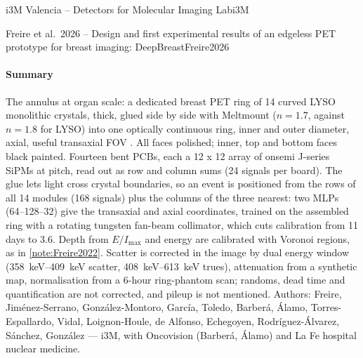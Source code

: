\begin{programnote}{i3M Valencia -- Detectors for Molecular Imaging Lab}{i3M}
\begin{papernote}{Freire et al.\ 2026 -- Design and first experimental results of an edgeless PET prototype for breast imaging: DeepBreast}{Freire2026}
\paragraph{Summary}
The annulus at organ scale: a dedicated breast PET ring of 14 curved LYSO
monolithic crystals,  thick, glued side by side with Meltmount
($n = 1.7$, against $n = 1.8$ for LYSO) into one optically continuous ring,
 inner and  outer diameter,  axial, useful transaxial
FOV . All faces polished; inner, top and bottom faces black painted.
Fourteen bent PCBs, each a 12 x 12 array of onsemi J-series SiPMs at
 pitch, read out as row and column sums (24 signals per board). The
glue lets light cross crystal boundaries, so an event is positioned from the
rows of all 14 modules (168 signals) plus the columns of the three nearest:
two MLPs (64--128--32) give the transaxial and axial coordinates, trained on
the assembled ring with a rotating tungsten fan-beam collimator, which cuts
calibration from 11 days to 3.6. Depth from $E/I_{\max}$ and energy are
calibrated with Voronoi regions, as in \ref{note:Freire2022}. Scatter is
corrected in the image by dual energy window (\qtyrange{358}{409}{\kilo\electronvolt}
scatter, \qtyrange{408}{613}{\kilo\electronvolt} trues), attenuation from a
synthetic map, normalisation from a 6-hour ring-phantom scan; randoms, dead
time and quantification are not corrected, and pileup is not mentioned.
Authors: Freire, Jiménez-Serrano, González-Montoro,
García, Toledo, Barberá, Álamo, Torres-Espallardo, Vidal, Loignon-Houle,
de Alfonso, Echegoyen, Rodríguez-Álvarez, Sánchez, González --- i3M, with
Oncovision (Barberá, Álamo) and La Fe hospital nuclear medicine.


\end{papernote}
\end{programnote}

